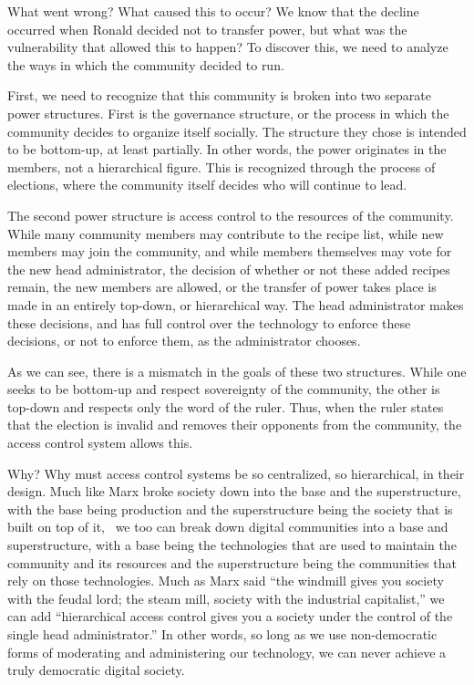 What went wrong? What caused this to occur? We know that the decline occurred
when Ronald decided not to transfer power, but what was the vulnerability that
allowed this to happen? To discover this, we need to analyze the ways in which
the community decided to run.

First, we need to recognize that this community is broken into two separate
power structures. First is the governance structure, or the process in which
the community decides to organize itself socially. The structure they chose is
intended to be bottom-up, at least partially. In other words, the power
originates in the members, not a hierarchical figure. This is recognized through
the process of elections, where the community itself decides who will continue
to lead.

The second power structure is access control to the resources of the community.
While many community members may contribute to the recipe list, while new
members may join the community, and while members themselves may vote for the
new head administrator, the decision of whether or not these added recipes
remain, the new members are allowed, or the transfer of power takes place is
made in an entirely top-down, or hierarchical way. The head administrator makes
these decisions, and has full control over the technology to enforce these
decisions, or not to enforce them, as the administrator chooses.

As we can see, there is a mismatch in the goals of these two structures. While
one seeks to be bottom-up and respect sovereignty of the community, the other is
top-down and respects only the word of the ruler. Thus, when the ruler states
that the election is invalid and removes their opponents from the community, the
access control system allows this.

Why? Why must access control systems be so centralized, so hierarchical, in
their design. Much like Marx broke society down into the base and the
superstructure, with the base being production and the superstructure being the
society that is built on top of it,~\cite{marx1911contribution} we too can break
down digital communities into a base and superstructure, with a base being the
technologies that are used to maintain the community and its resources and the
superstructure being the communities that rely on those technologies. Much as
Marx said ``the windmill gives you society with the feudal lord; the steam mill,
society with the industrial capitalist,'' \cite{marx1920poverty} we can add
``hierarchical access control gives you a society under the control of the
single head administrator.'' In other words, so long as we use non-democratic
forms of moderating and administering our technology, we can never achieve a
truly democratic digital society.
